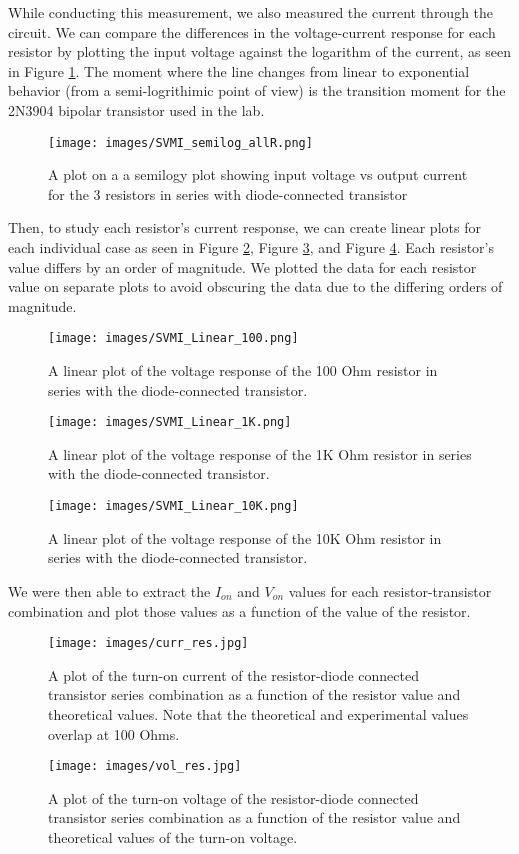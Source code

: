 \documentclass{article}
\begin{document}
While conducting this measurement, we also measured the current through the circuit. We can compare the differences in the  voltage-current response for each resistor by plotting the input voltage against the logarithm of the current, as seen in Figure \ref{fig:test6}.  The moment where the line changes from linear to exponential behavior (from a semi-logrithimic point of view) is the transition moment for the 2N3904 bipolar transistor used in the lab.
\begin{figure}[H]   
  \centering        
  \texttt{[image: images/SVMI\_semilog\_allR.png]}
  \caption{A plot on a a semilogy  plot showing input voltage vs output current for the 3 resistors in series with diode-connected transistor}
  \label{fig:test6}
\end{figure}
Then, to study each resistor's current response, we can create linear plots for each individual case as seen in Figure \ref{fig:test7}, Figure \ref{fig:test8}, and Figure \ref{fig:test9}. Each resistor's value differs by an order of magnitude. We plotted the data for each resistor value on separate plots to avoid obscuring the data due to the differing orders of magnitude.
\begin{figure}[H]   
  \centering        
  \texttt{[image: images/SVMI\_Linear\_100.png]}
  \caption{A linear plot of the voltage response of the 100 Ohm resistor in series with the diode-connected transistor.}
  \label{fig:test7}
\end{figure}
\begin{figure}[H]   
  \centering        
  \texttt{[image: images/SVMI\_Linear\_1K.png]}
  \caption{A linear plot of the voltage response of the 1K Ohm resistor in series with the diode-connected transistor.}
  \label{fig:test8}
\end{figure}
\begin{figure}[H]   
  \centering        
  \texttt{[image: images/SVMI\_Linear\_10K.png]}
  \caption{A linear plot of the voltage response of the 10K Ohm resistor in series with the diode-connected transistor.}
  \label{fig:test9}
\end{figure}

We were then able to extract the $I_{on}$ and $V_{on}$ values for each resistor-transistor combination and plot those values as a function of the value of the resistor. 
\begin{figure}[H]   
  \centering        
  \texttt{[image: images/curr\_res.jpg]}
  \caption{A plot of the turn-on current of the resistor-diode connected transistor series combination as a function of the resistor value and theoretical values. Note that the theoretical and experimental values overlap at 100 Ohms.}
  \label{fig:test10}
\end{figure}
\begin{figure}[H]   
  \centering        
  \texttt{[image: images/vol\_res.jpg]}
  \caption{A plot of the turn-on voltage of the resistor-diode connected transistor series combination as a function of the resistor value and theoretical values of the turn-on voltage.}
  \label{fig:test11}
\end{figure}
\end{document}
